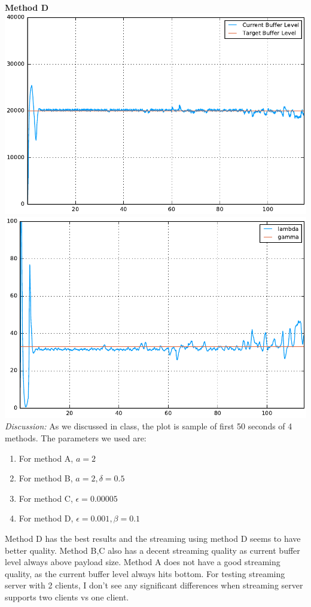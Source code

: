\documentclass[12pt]{article}
\newenvironment{problem}[2][Problem]{\begin{trivlist}
\item[\hskip \labelsep {\bfseries #1}\hskip \labelsep {\bfseries #2.}]}{\end{trivlist}}
\begin{document}
\begin{problem}{1}
\\
\textbf{Method D}
\\
\includegraphics[scale = .5]{listen3.pdf}
\includegraphics[scale = .5]{stream3.pdf}
\\
\textit{Discussion:}
As we discussed in class, the plot is sample of first 50 seconds of 4 methods. The parameters we used are:
\begin{enumerate}
	\item For method A, $a = 2$
	\item For method B, $a = 2, \delta = 0.5$
	\item For method C, $\epsilon = 0.00005$
	\item For method D, $\epsilon = 0.001, \beta = 0.1$
\end{enumerate}
Method D has the best results and the streaming using method D seems to have better quality. Method B,C also has a decent streaming quality as current buffer level always above payload size. Method A does not have a good streaming quality, as the current buffer level always hits bottom. For testing streaming server with 2 clients, I don't see any significant differences when streaming server supports two clients vs one client.
\end{problem}
\end{document}
